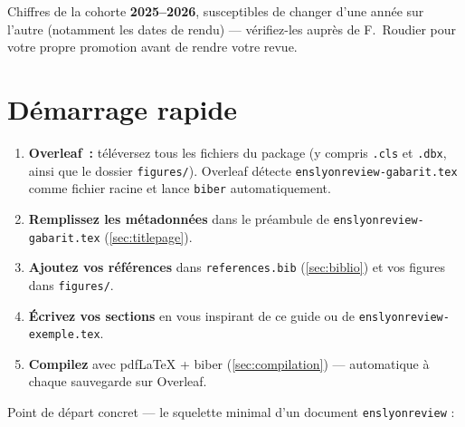 \documentclass[11pt, a4paper]{article}
\begin{document}
\begin{attention}
Chiffres de la cohorte \textbf{2025--2026}, susceptibles de changer d'une
année sur l'autre (notamment les dates de rendu) — vérifiez-les auprès de
F.~Roudier pour votre propre promotion avant de rendre votre revue.
\end{attention}

\section{Démarrage rapide}
\label{sec:quickstart}

\begin{enumerate}
  \item \textbf{Overleaf~:} téléversez tous les fichiers du package (y
    compris \texttt{.cls} et \texttt{.dbx}, ainsi que le dossier
    \texttt{figures/}). Overleaf détecte \texttt{enslyonreview-gabarit.tex}
    comme fichier racine et lance \texttt{biber} automatiquement.
  \item \textbf{Remplissez les métadonnées} dans le préambule de
    \texttt{enslyonreview-gabarit.tex} (\cref{sec:titlepage}).
  \item \textbf{Ajoutez vos références} dans \texttt{references.bib}
    (\cref{sec:biblio}) et vos figures dans \texttt{figures/}.
  \item \textbf{Écrivez vos sections} en vous inspirant de ce guide ou de
    \texttt{enslyonreview-exemple.tex}.
  \item \textbf{Compilez} avec pdf\LaTeX{} + biber
    (\cref{sec:compilation}) — automatique à chaque sauvegarde sur
    Overleaf.
\end{enumerate}

Point de départ concret — le squelette minimal d'un document
\texttt{enslyonreview} :
\end{document}

